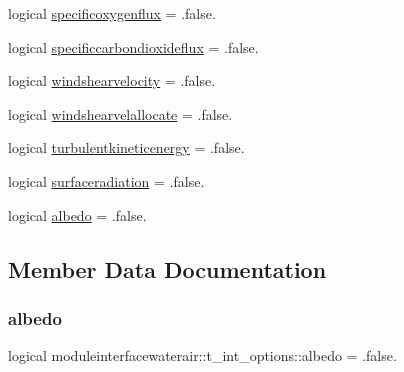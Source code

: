 \begin{DoxyCompactItemize}
\item 
logical \mbox{\hyperlink{structmoduleinterfacewaterair_1_1t__int__options_afd2d6831e94caeda94d1d4f7d66490f1}{specificoxygenflux}} = .false.
\item 
logical \mbox{\hyperlink{structmoduleinterfacewaterair_1_1t__int__options_ae3f499a29090c58f6703c0c8d3b4e7f5}{specificcarbondioxideflux}} = .false.
\item 
logical \mbox{\hyperlink{structmoduleinterfacewaterair_1_1t__int__options_a08d9e4b19b20e0af1eceeae42621fb40}{windshearvelocity}} = .false.
\item 
logical \mbox{\hyperlink{structmoduleinterfacewaterair_1_1t__int__options_a72cd127527cde4a5978f2d32e223c112}{windshearvelallocate}} = .false.
\item 
logical \mbox{\hyperlink{structmoduleinterfacewaterair_1_1t__int__options_ae4a3d165d548a655b73a1d0a4e044fb3}{turbulentkineticenergy}} = .false.
\item 
logical \mbox{\hyperlink{structmoduleinterfacewaterair_1_1t__int__options_ad0242836c6c33c443f5af3b0b9880c83}{surfaceradiation}} = .false.
\item 
logical \mbox{\hyperlink{structmoduleinterfacewaterair_1_1t__int__options_a67ba84dbcbd5270f7a80bf561dd4e276}{albedo}} = .false.
\end{DoxyCompactItemize}


\subsection{Member Data Documentation}
\mbox{\label{structmoduleinterfacewaterair_1_1t__int__options_a67ba84dbcbd5270f7a80bf561dd4e276}} 
\subsubsection{\texorpdfstring{albedo}{albedo}}
{\footnotesize\ttfamily logical moduleinterfacewaterair\+::t\+\_\+int\+\_\+options\+::albedo = .false.\hspace{0.3cm}{\ttfamily [private]}}

\mbox{\label{structmoduleinterfacewaterair_1_1t__int__options_a2ea4e7eb5ca7f9f1350ba31fc6c6bea2}} 
